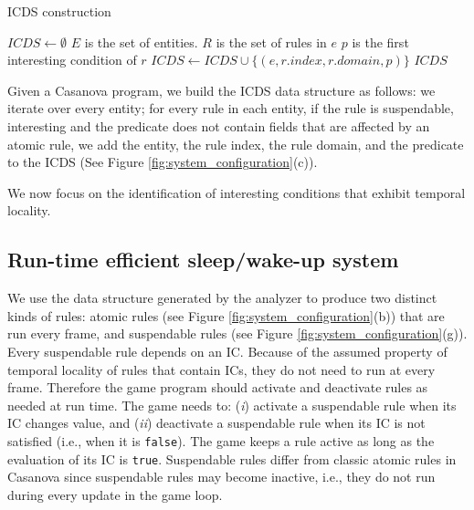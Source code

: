 \begin{algorithm}
\caption{ICDS construction}

\label{alg:icds_construction}
\begin{algorithmic}
    \State $ICDS \gets \emptyset$
    \State $E$ is the set of entities.
        \State $R$ is the set of rules in $e$
                \State $p$ is the first interesting condition of $r$
                    \State $ICDS \gets ICDS \cup \lbrace (e,r.index,r.domain,p) \rbrace$
                \EndIf
            \EndIf
        \EndFor
    \EndFor
    \State \Return $ICDS$
\EndFunction
\end{algorithmic}
\end{algorithm}


Given a Casanova program, we build the ICDS data structure as follows: we iterate over every entity; for every rule in each entity, if the rule is suspendable, interesting and the predicate does not contain fields that are affected by an atomic rule, we add the entity, the rule index, the rule domain, and the predicate to the ICDS (See Figure \ref{fig:system_configuration}(c)).

We now focus on the identification of interesting conditions that exhibit temporal locality.

\subsection{Run-time efficient sleep/wake-up system}

We use the data structure generated by the analyzer to produce two distinct kinds of rules: atomic rules (see Figure \ref{fig:system_configuration}(b)) that are run every frame, and suspendable rules (see Figure \ref{fig:system_configuration}(g)). Every suspendable rule depends on an IC. %
Because of the assumed property of temporal locality of rules that contain ICs, they do not need to run at every frame. Therefore the game program should activate and deactivate rules as needed at run time. The game needs to: (\textit{i}) activate a suspendable rule when its IC changes value, and (\textit{ii}) deactivate a suspendable rule when its IC is not satisfied (i.e., when it is \texttt{false}). The game keeps a rule active as long as the evaluation of its IC is \texttt{true}. Suspendable rules differ from classic atomic rules in Casanova since suspendable rules may become inactive, i.e., they do not run during every update in the game loop.

